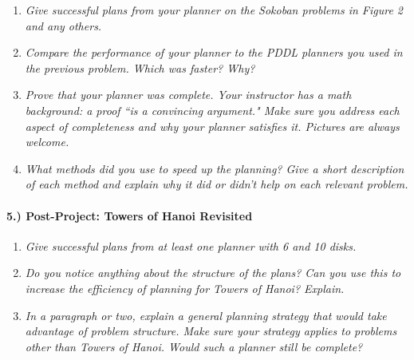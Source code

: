 \documentclass{article}
\begin{document}
\begin{enumerate}
\item{\textit{Give successful plans from your planner on the Sokoban problems in Figure 2 and any others.\\}}
\item{\textit{Compare the performance of your planner to the PDDL planners you used in the previous problem. Which was faster? Why?\\}}
\item{\textit{Prove that your planner was complete. Your instructor has a math background: a proof ``is a convincing argument." Make sure you address each aspect of completeness and why your planner satisfies it. Pictures are always welcome.\\}}
\item{\textit{What methods did you use to speed up the planning? Give a short description of each method and explain why it did or didn’t help on each relevant problem.\\}}
\end{enumerate}

\paragraph{5.) Post-Project: Towers of Hanoi Revisited}

\begin{enumerate}
\item{\textit{Give successful plans from at least one planner with 6 and 10 disks.\\}}
\item{\textit{Do you notice anything about the structure of the plans? Can you use this to increase the efficiency of planning for Towers of Hanoi? Explain.\\}}
\item{\textit{In a paragraph or two, explain a general planning strategy that would take advantage of problem structure. Make sure your strategy applies to problems other than Towers of Hanoi. Would such a planner still be complete?\\}}
\end{enumerate}



\end{document}
